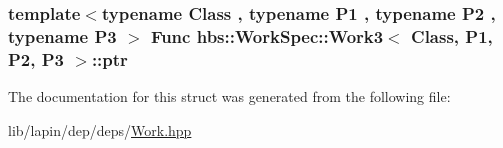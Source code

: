 \hypertarget{structhbs_1_1_work_spec_1_1_work3_ace83c17c48096a7a402dc27d39419e73}{
\subsubsection[{ptr}]{\setlength{\rightskip}{0pt plus 5cm}template$<$typename Class , typename P1 , typename P2 , typename P3 $>$ {\bf Func} {\bf hbs\-::\-Work\-Spec\-::\-Work3}$<$ Class, P1, P2, P3 $>$\-::ptr}}\label{structhbs_1_1_work_spec_1_1_work3_ace83c17c48096a7a402dc27d39419e73}


The documentation for this struct was generated from the following file\-:\begin{DoxyCompactItemize}
\item 
lib/lapin/dep/deps/\hyperlink{_work_8hpp}{Work.\-hpp}\end{DoxyCompactItemize}
